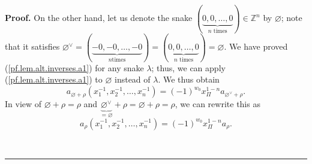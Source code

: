 \documentclass[numbers=enddot,12pt,final,onecolumn,notitlepage]{scrartcl}%
\theoremstyle{definition}
\newenvironment{proof}[1][Proof]{\noindent\textbf{#1.} }{\ \rule{0.5em}{0.5em}}
\begin{document}
\begin{proof}
On the other hand, let us denote the snake $\left(  \underbrace{0,0,\ldots
,0}_{n\text{ times}}\right)  \in\mathbb{Z}^{n}$ by $\varnothing$; note that it
satisfies $\varnothing^{\vee}=\left(  \underbrace{-0,-0,\ldots,-0}_{n\text{
times}}\right)  =\left(  \underbrace{0,0,\ldots,0}_{n\text{ times}}\right)
=\varnothing$. We have proved (\ref{pf.lem.alt.inverses.a1}) for any snake
$\lambda$; thus, we can apply (\ref{pf.lem.alt.inverses.a1}) to $\varnothing$
instead of $\lambda$. We thus obtain%
\[
a_{\varnothing+\rho}\left(  x_{1}^{-1},x_{2}^{-1},\ldots,x_{n}^{-1}\right)
=\left(  -1\right)  ^{w_{0}}x_{\Pi}^{1-n}a_{\varnothing^{\vee}+\rho}.
\]
In view of $\varnothing+\rho=\rho$ and $\underbrace{\varnothing^{\vee}%
}_{=\varnothing}+\rho=\varnothing+\rho=\rho$, we can rewrite this as%
\begin{equation}
a_{\rho}\left(  x_{1}^{-1},x_{2}^{-1},\ldots,x_{n}^{-1}\right)  =\left(
-1\right)  ^{w_{0}}x_{\Pi}^{1-n}a_{\rho}. \label{pf.lem.alt.inverses.a2}%
\end{equation}



\end{proof}
\end{document}
